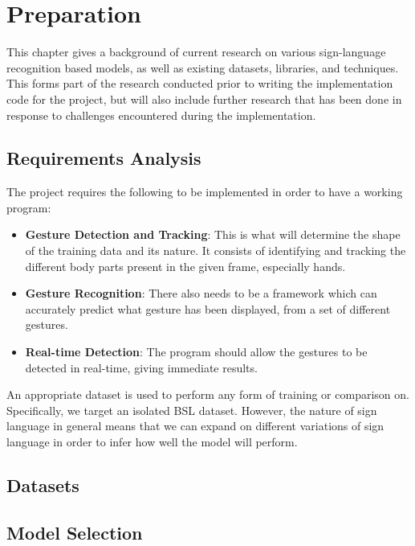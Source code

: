 \documentclass[final,rdr32.tex]{subfiles}
\begin{document}
\chapter{Preparation}

This chapter gives a background of current research on various sign-language recognition based models, as well as existing datasets, libraries, and techniques. This forms part of the research conducted prior to writing the implementation code for the project, but will also include further research that has been done in response to challenges encountered during the implementation.

\section{Requirements Analysis}

The project requires the following to be implemented in order to have a working program:

\begin{itemize}
    \item \textbf{Gesture Detection and Tracking}: This is what will determine the shape of the training data and its nature. It consists of identifying and tracking the different body parts present in the given frame, especially hands.
    \item \textbf{Gesture Recognition}: There also needs to be a framework which can accurately predict what gesture has been displayed, from a set of different gestures.
    \item \textbf{Real-time Detection}: The program should allow the gestures to be detected in real-time, giving immediate results.

\end{itemize}


An appropriate dataset is used to perform any form of training or comparison on. Specifically, we target an isolated BSL dataset. However, the nature of sign language in general means that we can expand on different variations of sign language in order to infer how well the model will perform.

\section{Datasets}

\section{Model Selection}
\end{document}
